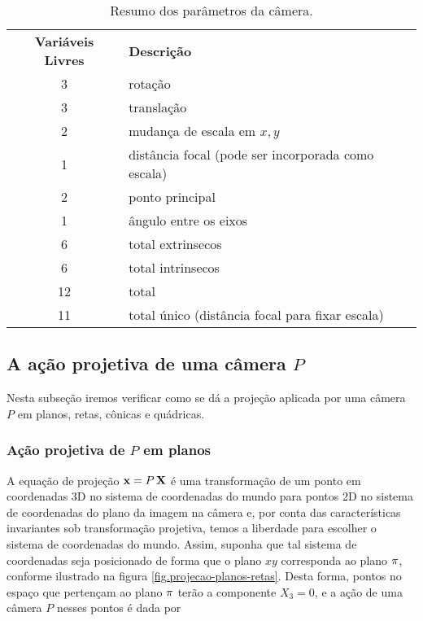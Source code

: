 \begin{table}
\begin{center}
\begin{tabular}{c l} 
\textbf{Variáveis Livres} & \textbf{Descrição}\\
3	 & rotação \\
3	 & translação \\
2	 & mudança de escala em $x,y$\\
1	 & distância focal (pode ser incorporada como escala)\\
2	 & ponto principal\\
1	 & ângulo entre os eixos \\
6  & total extrinsecos\\
6  & total intrinsecos\\
12 & total\\
11 & total único (distância focal para fixar escala)
\end{tabular}
\end{center}
\caption{Resumo dos parâmetros da câmera.}
\end{table}

\subsection{A ação projetiva de uma câmera $P$}
Nesta subseção iremos verificar como se dá a projeção aplicada por uma câmera $P$ em planos, retas, cônicas e quádricas.


\subsubsection*{Ação projetiva de $P$ em planos}
A equação de projeção $\mathbf{x}=P\,\mathbf{X}$ é uma transformação de um ponto em coordenadas 3D no sistema de coordenadas do mundo para pontos 2D no sistema de coordenadas do plano da imagem na câmera e, por conta das características invariantes sob transformação projetiva, temos a liberdade para escolher o sistema de coordenadas do mundo. Assim, suponha que tal sistema de coordenadas seja posicionado de forma que o plano $xy$ corresponda ao plano $\pi$, conforme ilustrado na figura \ref{fig.projecao-planos-retas}. Desta forma, pontos no espaço que pertençam ao plano $\pi$ terão a componente $X_3=0$, e a ação de uma câmera $P$ nesses pontos é dada por

